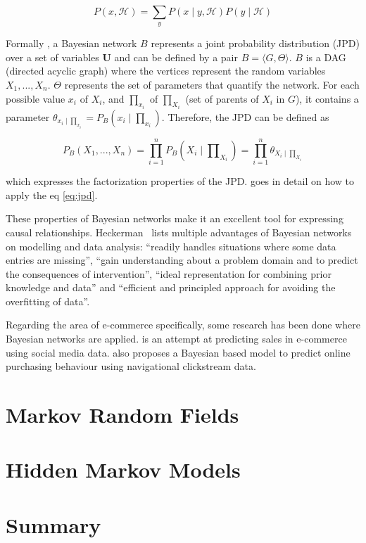 \begin{equation}
P(x, \mathcal{H}) = \sum_{y}^{} P(x \mid y, \mathcal{H}) P(y \mid \mathcal{H}) 
\label{eq:sum}
\end{equation}

Formally \cite{Pearl:1988:PRI:534975}, a Bayesian network $ B $ represents a 
joint probability distribution (JPD) over a set of variables $ \mathbf{U}$ and 
can be defined by a pair $ B = \langle G, \Theta \rangle $. $ B $ is a DAG 
(directed acyclic graph) where the vertices represent the random variables $ 
X_{1}, ..., X_{n} $. $ \Theta $ represents the set of parameters that quantify 
the network. For each possible value $ x_{i} $ of $ X_{i} $, and $ 
\prod_{x_{i}} $ of $ \prod_{X_{i}} $ (set of parents of $ X_{i} $ in $ G $), it 
contains a parameter $ \theta_{x_{i} \mid \prod_{x_{i}}} = P_{B}(x_{i} \mid 
\prod_{x_{i}}) $. Therefore, the JPD can be defined as

\begin{equation}
P_{B}(X_{1}, ..., X_{n}) = \prod_{i=1}^{n} P_{B}(X_{i} \mid 
\prod\nolimits_{X_{i}}) =
\prod_{i=1}^{n} \theta_{X_{i} \mid \prod_{X_{i}}} \label{eq:jpd}
\end{equation}

which expresses the factorization properties of the JPD. \cite[section 
8.1.]{bishop2006pattern} goes in detail on how to apply the eq \ref{eq:jpd}.

These properties of Bayesian networks make it an excellent tool for expressing 
causal relationships. Heckerman~\cite{Heckerman1996} lists multiple advantages 
of Bayesian networks on modelling and data analysis: ``readily handles 
situations where some data entries are missing'', ``gain understanding about a 
problem domain and to predict the consequences of intervention'', ``ideal 
representation for combining prior knowledge and data'' and ``efficient and 
principled approach for avoiding the overfitting of data''.

Regarding the area of e-commerce specifically, some research has been done 
where Bayesian networks are applied. \cite{Nasambu2014} is an attempt at 
predicting sales in e-commerce using social media data. \cite{Moe2002} also 
proposes a Bayesian based model to predict online purchasing behaviour using 
navigational clickstream data.

\section{Markov Random Fields}

\section{Hidden Markov Models}

\cite{Rabiner1989}

\section{Summary}
